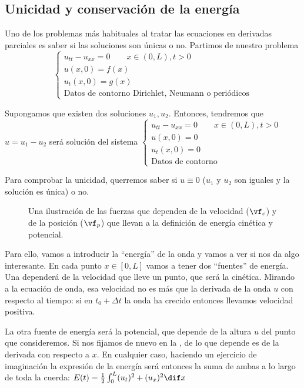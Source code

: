 	\subsection{Unicidad y conservación de la energía}

		Uno de los problemas más habituales al tratar las ecuaciones en derivadas parciales es saber si las soluciones son únicas o no. Partimos de nuestro problema
		\[ \begin{cases}
			u_{tt}-u_{xx} = 0\qquad x \in (0,L), t >0 \\
			u(x,0) = f(x) 	\\
			u_t(x,0) = g(x) \\
			\text{Datos de contorno Dirichlet, Neumann o periódicos}
		\end{cases} \]

		Supongamos que existen dos soluciones $u_1, u_{2}$. Entonces, tendremos que $u = u_1 - u_2$ será solución del sistema
		\( \begin{cases}
			u_{tt}-u_{xx} = 0\qquad x \in (0,L), t >0 \\
			u(x,0) = 0 	\\
			u_t(x,0) = 0 \\
			\text{Datos de contorno}
		\end{cases} \label{eq:Onda:ProblemaUnicidad} \)

		Para comprobar la unicidad, querremos saber si $u \equiv 0$ ($u_1$ y $u_2$ son iguales y la solución es única) o no.

		\begin{figure}[hbtp]
		\centering
		\caption{Una ilustración de las fuerzas que dependen de la velocidad ($\vf_c$) y de la posición ($\vf_p$) que llevan a la definición de energía cinética y potencial.}
		\label{fig:EnergiaOnda}
		\end{figure}

		Para ello, vamos a introducir la ``energía'' de la onda y vamos a ver si nos da algo interesante. En cada punto $x ∈ [0,L]$ vamos a tener dos ``fuentes'' de energía. Una dependerá de la velocidad que lleve un punto, que será la cinética. Mirando a la ecuación de onda, esa velocidad no es más que la derivada de la onda $u$ con respecto al tiempo: si en $t_0 + Δt$ la onda ha crecido entonces llevamos velocidad positiva.

		La otra fuente de energía será la potencial, que depende de la altura $u$ del punto que consideremos. Si nos fijamos de nuevo en la , de lo que depende es de la derivada con respecto a $x$. En cualquier caso, haciendo un ejercicio de imaginación la expresión de la energía será entonces la suma de ambas a lo largo de toda la cuerda:
		\( E(t) = \frac{1}{2} \int_0^L (u_t)^2 + (u_x)^2 \dif x \label{eq:Onda:Energia} \)

